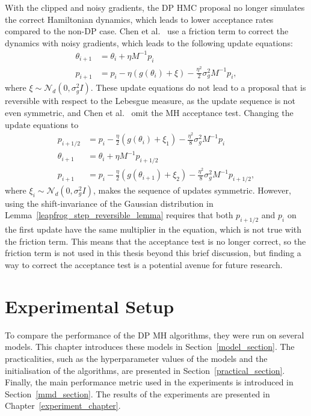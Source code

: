 \documentclass[english,twoside,openright]{HYgraduMLDS}
\newcommand{\caln}{{\mathcal{N}}}
\begin{document}
With the clipped and noisy gradients, the DP HMC proposal no longer simulates
the correct Hamiltonian dynamics, which leads to lower acceptance rates
compared to the non-DP case. Chen et al.~\cite{CFG14} use a friction term
to correct the dynamics with noisy gradients, which leads to the following
update equations:
\begin{align*}
	\theta_{i+1} &= \theta_{i} + \eta M^{-1}p_{i} \\
  p_{i+1} &= p_{i} - \eta (g(\theta_{i}) + \xi)
            - \frac{\eta^{2}}{2} \sigma_{g}^{2} M^{-1}p_{i},
\end{align*}
where \(\xi\sim \caln_{d}(0, \sigma_{g}^{2}I)\). These update equations do not
lead to a proposal that is reversible with respect to the Lebesgue measure,
as the update sequence is not even symmetric,
and Chen et al.~\cite{CFG14} omit the MH acceptance test. Changing the
update equations to
\begin{align*}
  p_{i+1/2} &= p_{i} - \frac{\eta}{2} (g(\theta_{i}) + \xi_{1})
            - \frac{\eta^{2}}{8} \sigma_{g}^{2} M^{-1}p_{i} \\
	\theta_{i+1} &= \theta_{i} + \eta M^{-1}p_{i+1/2} \\
  p_{i+1} &= p_{i} - \frac{\eta}{2} (g(\theta_{i+1}) + \xi_{2})
            - \frac{\eta^{2}}{8} \sigma_{g}^{2} M^{-1}p_{i+1/2},
\end{align*}
where \(\xi_{i}\sim \caln_{d}(0, \sigma_{g}^{2}I)\), makes the sequence of
updates symmetric. However, using the shift-invariance of the Gaussian
distribution in Lemma~\ref{leapfrog_step_reversible_lemma} requires that
both \(p_{i+1/2}\) and \(p_{i}\) on the first update have the same multiplier
in the equation, which is not true with the friction term.
This means that the acceptance test is no longer correct, so
the friction term is not used in this thesis beyond this brief discussion,
but finding a way to correct the acceptance test is a potential avenue for
future research.

\chapter{Experimental Setup}\label{experiment_setup_chapter}

To compare the performance of the DP MH algorithms, they were run on
several models. This chapter introduces these models in
Section~\ref{model_section}. The practicalities, such as
the hyperparameter values of the models and the initialisation of the
algorithms, are presented in Section~\ref{practical_section}.
Finally, the main performance
metric used in the experiments is introduced in Section~\ref{mmd_section}.
The results of the experiments are presented in Chapter~\ref{experiment_chapter}.
\end{document}
